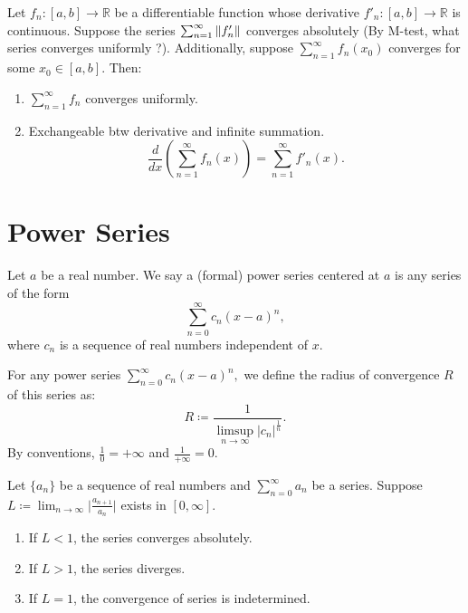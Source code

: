 \documentclass[12pt]{article}
\begin{document}
\begin{corollary}
    Let $f_n:[a,b]\rightarrow\mathbb{R}$ be a differentiable function whose derivative $f'_n:[a,b]\rightarrow\mathbb{R}$ is continuous.
    Suppose the series $\sum_{n=1}^{\infty}\left\lVert f'_n \right\rVert$ converges absolutely (By M-test, what series converges uniformly ?).
    Additionally, suppose $\sum_{n=1}^{\infty}f_n(x_0)$ converges for some $x_0\in [a,b]$.
    Then:
    \begin{enumerate}
        \item $\sum_{n=1}^{\infty}f_n$ converges uniformly.
        \item Exchangeable btw derivative and infinite summation.
        \[\frac{d}{dx}(\sum_{n=1}^{\infty}f_n(x))= \sum_{n=1}^{\infty}f'_n(x).\]
    \end{enumerate}
\end{corollary}



\section{Power Series}

\begin{definition}
    Let $a$ be a real number. We say a (formal) power series centered at $a$ is any series of the form
    \[\sum_{n=0}^{\infty}c_n(x-a)^n,\]
    where $c_n$ is a sequence of real numbers independent of $x$.
\end{definition}

\begin{definition}
For any power series $\sum_{n=0}^{\infty
}c_n(x-a)^n,$ we define the radius of convergence $R$ of this series as:
\[R \coloneqq \frac{1}{\limsup_{n\rightarrow\infty}\lvert c_n\rvert^\frac{1}{n}}.\]
By conventions, $\frac{1}{0}=+\infty$ and $\frac{1}{+\infty}=0$.    
\end{definition}
\begin{theorem}
    Let $\{a_n\}$ be a sequence of real numbers and $\sum_{n=0}^{\infty}a_n$ be a series. Suppose $L\coloneqq\lim_{n\rightarrow\infty}\lvert\frac{a_{n+1}}{a_n}\rvert$ exists in $[0,\infty]$.
    \begin{enumerate}
        \item If $L<1$, the series converges absolutely.
        \item If $L>1$, the series diverges.
        \item If $L=1$, the convergence of series is indetermined.
    \end{enumerate}
\end{theorem}
\end{document}
